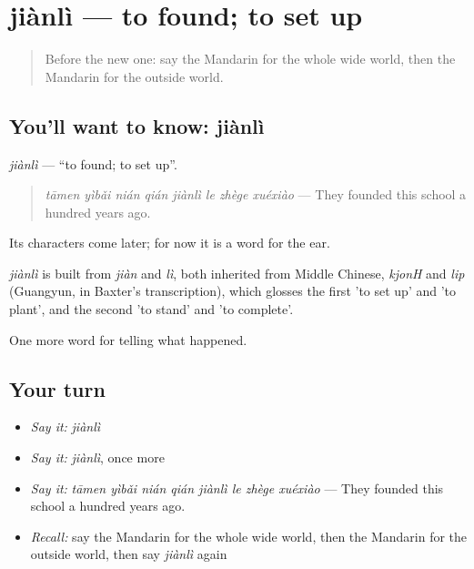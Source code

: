 \section[jiànlì]{jiànlì — to found; to set up}

\label{lesson:ZH-C326-jianli}



\begin{quote}
Before the new one: say the Mandarin for the whole wide world, then the Mandarin for the outside world.
\end{quote}

\subsection*{You'll want to know: jiànlì}
\emph{jiànlì} — \textquotedblleft{}to found; to set up\textquotedblright{}.

\begin{quote}
\emph{tāmen yìbǎi nián qián jiànlì le zhège xuéxiào} — They founded this school a hundred years ago.
\end{quote}

Its characters come later; for now it is a word for the ear.

\begin{cousinweb}
\emph{jiànlì} is built from \emph{jiàn} and \emph{lì}, both inherited from Middle Chinese, \emph{kjonH} and \emph{lip} (Guangyun, in Baxter's transcription), which glosses the first 'to set up' and 'to plant', and the second 'to stand' and 'to complete'.
\end{cousinweb}

\begin{grammarlens}[title={What you've built}]
One more word for telling what happened.
\end{grammarlens}

\subsection*{Your turn}
\begin{itemize}
\raggedright
  \item \emph{Say it:} \emph{jiànlì}
  \item \emph{Say it:} \emph{jiànlì}, once more
  \item \emph{Say it:} \emph{tāmen yìbǎi nián qián jiànlì le zhège xuéxiào} — They founded this school a hundred years ago.
  \item \emph{Recall:} say the Mandarin for the whole wide world, then the Mandarin for the outside world, then say \emph{jiànlì} again
\end{itemize}

